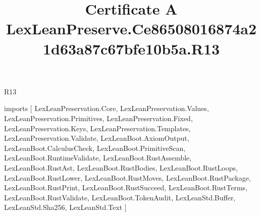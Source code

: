 \begin{lexlean}{R13}
\title{Certificate A LexLeanPreserve.Ce86508016874a21d63a87c67bfe10b5a.R13}
\begin{coremodule}
imports [
  LexLeanPreservation.Core,
  LexLeanPreservation.Values,
  LexLeanPreservation.Primitives,
  LexLeanPreservation.Fixed,
  LexLeanPreservation.Keys,
  LexLeanPreservation.Templates,
  LexLeanPreservation.Validate,
  LexLeanBoot.AxiomOutput,
  LexLeanBoot.CalculusCheck,
  LexLeanBoot.PrimitiveScan,
  LexLeanBoot.RuntimeValidate,
  LexLeanBoot.RustAssemble,
  LexLeanBoot.RustAst,
  LexLeanBoot.RustBodies,
  LexLeanBoot.RustLoops,
  LexLeanBoot.RustLower,
  LexLeanBoot.RustMoves,
  LexLeanBoot.RustPackage,
  LexLeanBoot.RustPrint,
  LexLeanBoot.RustSucceed,
  LexLeanBoot.RustTerms,
  LexLeanBoot.RustValidate,
  LexLeanBoot.TokenAudit,
  LexLeanStd.Buffer,
  LexLeanStd.Sha256,
  LexLeanStd.Text
]


\end{coremodule}
\end{lexlean}
